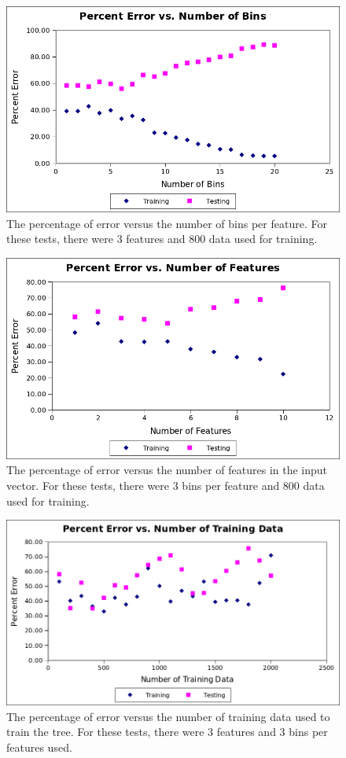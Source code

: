 \documentclass{article}
\begin{document}
	\begin{figure}[h]
		\centerline{\includegraphics[width = 5in]{bins.png}}
		\caption{The percentage of error versus the number of bins per feature. For these tests, there were 3 features and 800 data used for training.}		
	\end{figure}
	
	\begin{figure}
		\centerline{\includegraphics[width = 5in]{features.png}}
		\caption{The percentage of error versus the number of features in the input vector. For these tests, there were 3 bins per feature and 800 data used for training.}		
	\end{figure}
	
	\begin{figure}
		\centerline{\includegraphics[width = 5in]{training.png}}
		\caption{The percentage of error versus the number of training data used to train the tree. For these tests, there were 3 features and 3 bins per features used.}		
	\end{figure}
	
\end{document}
